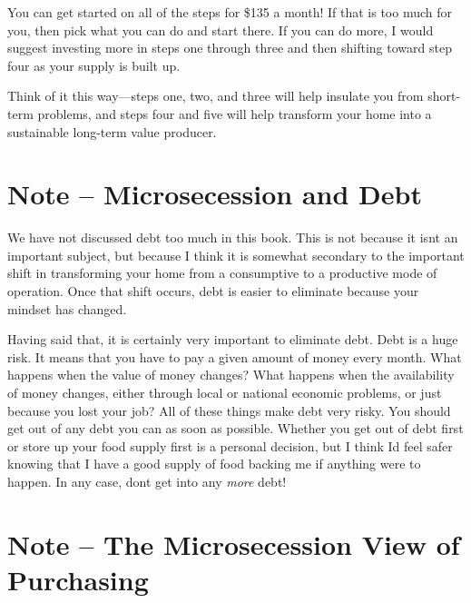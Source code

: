 \begin{itemize}
\item 
Emergency Supply - \$40}
\item 
Long-term Value Savings - \$15}
\item {\selectlanguage{english}\color{black}
Capital Assets - \$50}
\item {\selectlanguage{english}\color{black}
Education - \$30}
\end{itemize}
{\color{black}
You can get started on all of the steps for \$135 a
month! If that is too
much for you, then pick what you can do and start there. If you can do
more, I would suggest investing more in steps one through three and
then shifting toward step four as your supply is built up.


Think of it this way—steps one, two, and three will help insulate you
from short-term problems, and steps four and five will help transform
your home into a sustainable long-term value producer.

\section{Note – Microsecession and Debt}

We have not discussed debt too much in this book. This is not because it
isn{\textquotesingle}t an important subject, but because I think it is
somewhat secondary to the important shift in transforming your home
from a consumptive to a productive mode of operation. Once that shift
occurs, debt is easier to eliminate because your mindset has changed. 


Having said that, it is certainly very important to eliminate debt. Debt
is a huge risk. It means that you have to pay a given amount of money
every month. What happens when the value of money changes?  What
happens when the availability of money changes, either through local or
national economic problems, or just because you lost your job?  All of
these things make debt very risky. You should get out of any debt you
can as soon as possible. Whether you get out of debt first or store up
your food supply first is a personal decision, but I think
I{\textquotesingle}d feel safer knowing that I have a good supply of
food backing me if anything were to happen. In any case,
don{\textquotesingle}t get into any \textit{more} debt!

\section{Note – The
Microsecession View of Purchasing}

}
